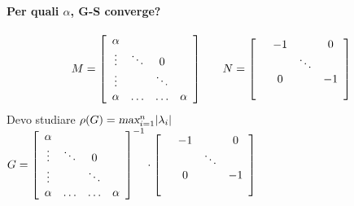 \documentclass[10pt]{book}
\begin{document}
\paragraph{Per quali $\alpha$, G-S converge?}
$$M = \left[\begin{array}{c c c c}
\alpha &  & & \\
\vdots & \ddots & 0 \\
\vdots & & \ddots & \\
\alpha & \ldots & \ldots & \alpha
\end{array} \right]\:\:\:\:\:\:\:\:N = \left[\begin{array}{c c c c}
& -1 & & 0\\
& & \ddots\\
& 0 & & -1\\
& &  & 
\end{array} \right]$$
Devo studiare $\rho(G) = \textsl{max}_{i=1}^n |\lambda_i|$ \\
$G = \left[\begin{array}{c c c c}
\alpha &  & & \\
\vdots & \ddots & 0 \\
\vdots & & \ddots & \\
\alpha & \ldots & \ldots & \alpha
\end{array} \right]^{-1}\cdot\left[\begin{array}{c c c c}
& -1 & & 0\\
& & \ddots\\
& 0 & & -1\\
& &  & 
\end{array} \right]$
\end{document}
